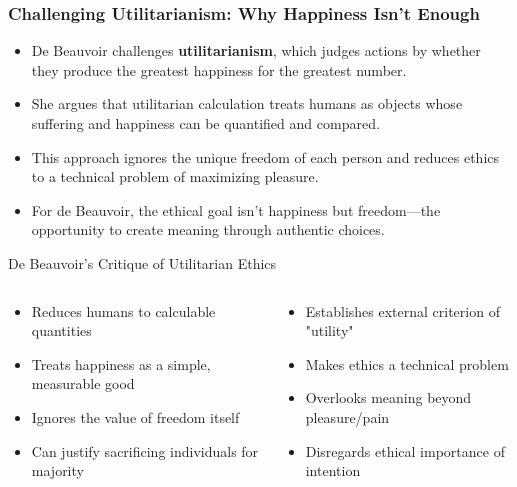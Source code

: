 \documentclass[aspectratio=169]{beamer}
\begin{document}
		\begin{frame}
			\frametitle{Challenging Utilitarianism: Why Happiness Isn't Enough}
			\begin{itemize}
				\item De Beauvoir challenges \textbf{utilitarianism}, which judges actions by whether they produce the greatest happiness for the greatest number.
				\item She argues that utilitarian calculation treats humans as objects whose suffering and happiness can be quantified and compared.
				\item This approach ignores the unique freedom of each person and reduces ethics to a technical problem of maximizing pleasure.
				\item For de Beauvoir, the ethical goal isn't happiness but freedom—the opportunity to create meaning through authentic choices.
			\end{itemize}
			
			\begin{block}{De Beauvoir's Critique of Utilitarian Ethics}
				\scriptsize
				\begin{columns}
					\begin{column}{0.48\textwidth}
						\begin{itemize}
							\item Reduces humans to calculable quantities
							\item Treats happiness as a simple, measurable good
							\item Ignores the value of freedom itself
							\item Can justify sacrificing individuals for majority
						\end{itemize}
					\end{column}
					\begin{column}{0.48\textwidth}
						\begin{itemize}
							\item Establishes external criterion of "utility"
							\item Makes ethics a technical problem
							\item Overlooks meaning beyond pleasure/pain
							\item Disregards ethical importance of intention
						\end{itemize}
					\end{column}
				\end{columns}
			\end{block}
		\end{frame}
	
\end{document}
